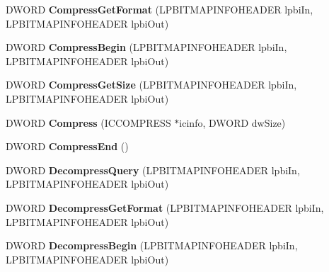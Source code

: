 \begin{DoxyCompactItemize}
\item 
\hypertarget{classCodecInst_aa3e8dab6446549d2c61946f94da2a8f6}{D\-W\-O\-R\-D {\bfseries Compress\-Get\-Format} (L\-P\-B\-I\-T\-M\-A\-P\-I\-N\-F\-O\-H\-E\-A\-D\-E\-R lpbi\-In, L\-P\-B\-I\-T\-M\-A\-P\-I\-N\-F\-O\-H\-E\-A\-D\-E\-R lpbi\-Out)}\label{classCodecInst_aa3e8dab6446549d2c61946f94da2a8f6}

\item 
\hypertarget{classCodecInst_ac9ef04e2930e6d8496dfe47aa2e2384a}{D\-W\-O\-R\-D {\bfseries Compress\-Begin} (L\-P\-B\-I\-T\-M\-A\-P\-I\-N\-F\-O\-H\-E\-A\-D\-E\-R lpbi\-In, L\-P\-B\-I\-T\-M\-A\-P\-I\-N\-F\-O\-H\-E\-A\-D\-E\-R lpbi\-Out)}\label{classCodecInst_ac9ef04e2930e6d8496dfe47aa2e2384a}

\item 
\hypertarget{classCodecInst_af548a7405630f94efdb586f2d35a445c}{D\-W\-O\-R\-D {\bfseries Compress\-Get\-Size} (L\-P\-B\-I\-T\-M\-A\-P\-I\-N\-F\-O\-H\-E\-A\-D\-E\-R lpbi\-In, L\-P\-B\-I\-T\-M\-A\-P\-I\-N\-F\-O\-H\-E\-A\-D\-E\-R lpbi\-Out)}\label{classCodecInst_af548a7405630f94efdb586f2d35a445c}

\item 
\hypertarget{classCodecInst_af9b3763a217bf98723b2c2e00693a954}{D\-W\-O\-R\-D {\bfseries Compress} (I\-C\-C\-O\-M\-P\-R\-E\-S\-S $\ast$icinfo, D\-W\-O\-R\-D dw\-Size)}\label{classCodecInst_af9b3763a217bf98723b2c2e00693a954}

\item 
\hypertarget{classCodecInst_ada702890c403996935aa8992b9594047}{D\-W\-O\-R\-D {\bfseries Compress\-End} ()}\label{classCodecInst_ada702890c403996935aa8992b9594047}

\item 
\hypertarget{classCodecInst_a3575d3335195c7039f8c1860c6cd819b}{D\-W\-O\-R\-D {\bfseries Decompress\-Query} (L\-P\-B\-I\-T\-M\-A\-P\-I\-N\-F\-O\-H\-E\-A\-D\-E\-R lpbi\-In, L\-P\-B\-I\-T\-M\-A\-P\-I\-N\-F\-O\-H\-E\-A\-D\-E\-R lpbi\-Out)}\label{classCodecInst_a3575d3335195c7039f8c1860c6cd819b}

\item 
\hypertarget{classCodecInst_a89fc029054fd29800f88769f2b9674eb}{D\-W\-O\-R\-D {\bfseries Decompress\-Get\-Format} (L\-P\-B\-I\-T\-M\-A\-P\-I\-N\-F\-O\-H\-E\-A\-D\-E\-R lpbi\-In, L\-P\-B\-I\-T\-M\-A\-P\-I\-N\-F\-O\-H\-E\-A\-D\-E\-R lpbi\-Out)}\label{classCodecInst_a89fc029054fd29800f88769f2b9674eb}

\item 
\hypertarget{classCodecInst_a7a5c331a9a964495a3d0fa112c3aa96f}{D\-W\-O\-R\-D {\bfseries Decompress\-Begin} (L\-P\-B\-I\-T\-M\-A\-P\-I\-N\-F\-O\-H\-E\-A\-D\-E\-R lpbi\-In, L\-P\-B\-I\-T\-M\-A\-P\-I\-N\-F\-O\-H\-E\-A\-D\-E\-R lpbi\-Out)}\label{classCodecInst_a7a5c331a9a964495a3d0fa112c3aa96f}


\end{DoxyCompactItemize}

